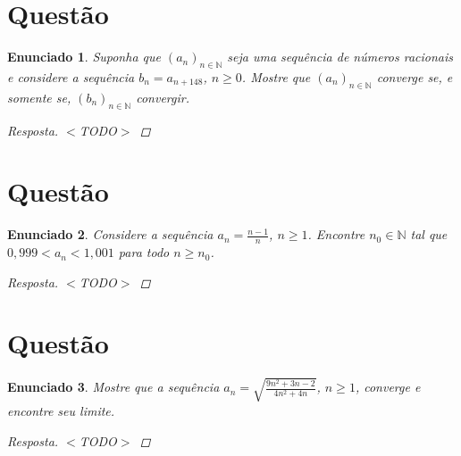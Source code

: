 \documentclass[a4paper,twoside,11pt]{article}
\newtheorem*{enunciado}{Enunciado}
\begin{document}
\section{Questão}
\begin{enunciado}
    Suponha que $(a_n)_{n \in \mathbb{N}}$ seja uma sequência de números racionais
    e considere a sequência $b_n = a_{n + 148}$, $n \geq 0$. Mostre que $(a_n)_{n \in \mathbb{N}}$
    converge se, e somente se, $(b_n)_{n \in \mathbb{N}}$ convergir.

    \begin{proof}[Resposta]
        $<$TODO$>$
    \end{proof}
\end{enunciado}



\section{Questão}
\begin{enunciado}
    Considere a sequência $a_n = \frac{n - 1}{n}$, $n \geq 1$. Encontre $n_0 \in \mathbb{N}$
    tal que $0,999 < a_n < 1,001$ para todo $n \geq n_0$.

    \begin{proof}[Resposta]
        $<$TODO$>$
    \end{proof}
\end{enunciado}



\section{Questão}
\begin{enunciado}
    Mostre que a sequência $a_n = \sqrt{\frac{9n^2 + 3n - 2}{4n^2+4n}}$, $n \geq 1$, converge e
    encontre seu limite.
    
    \begin{proof}[Resposta]
        $<$TODO$>$
    \end{proof}
\end{enunciado}
\end{document}
